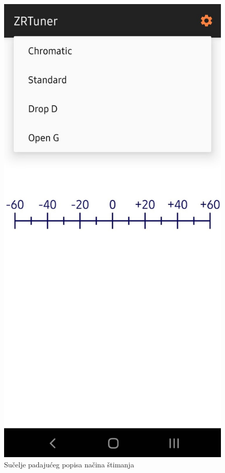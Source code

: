 \documentclass[times, utf8, zavrsni, numeric]{fer}
\begin{document}
\begin{figure}
	\centerline{\includegraphics[height=0.9\textheight]{zrtuner_spinner.jpeg}}
	\caption{Sučelje padajućeg popisa načina štimanja}
	\label{fig}
\end{figure}
\end{document}
